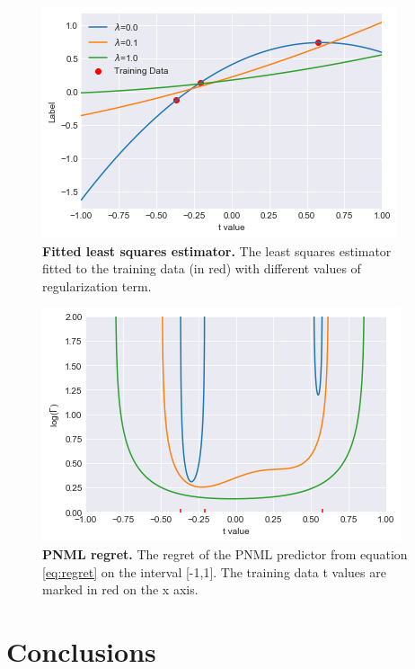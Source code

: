 \documentclass[letterpaper, 10 pt, conference]{ieeeconf}  %
\begin{document}
\begin{figure}[t] 
    \centering
    \includegraphics[width=\linewidth]{figures/least_sqaures_prediction.jpg}
    \caption{\textbf{Fitted least squares estimator. } The least squares estimator fitted to the training data (in red) with different values of regularization term.}
    \label{fig:least_squares_with_reg}
\end{figure}

\begin{figure}[t]
    \centering
    \includegraphics[width=\linewidth]{figures/least_sqaures_regret.jpg}
    \caption{\textbf{PNML regret.} The regret of the PNML predictor from equation \ref{eq:regret} on the interval [-1,1]. The training data t values are marked in red on the x axis.}
    \label{fig:regret_with_reg}
\end{figure}


\section{Conclusions} \label{sec:conclusion}
\end{document}
